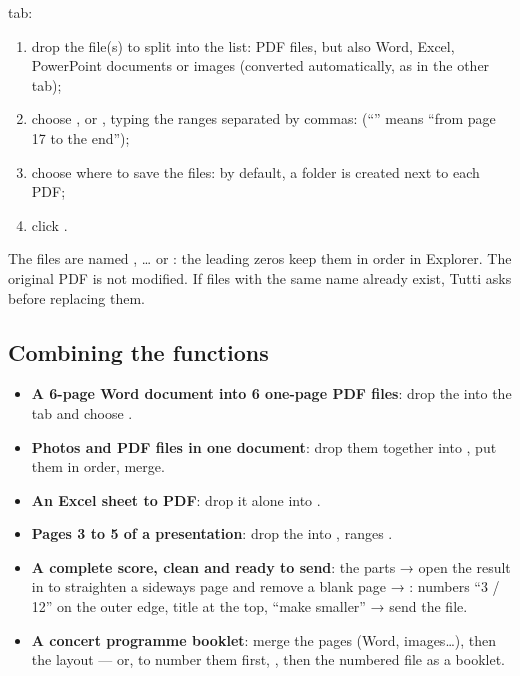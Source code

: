  tab:
\begin{enumerate}
\item drop the file(s) to split into the list: PDF files, but also Word, Excel, PowerPoint
      documents or images (converted automatically, as in the other tab);
\item choose , or , typing the ranges separated by
      commas:  (“” means “from page 17 to the end”);
\item choose where to save the files: by default, a  folder is created
      next to each PDF;
\item click .
\end{enumerate}
The files are named , … or
: the leading zeros keep them in order in Explorer.
The original PDF is not modified. If files with the same name already exist, Tutti asks before
replacing them.


\subsection*{Combining the functions}
\begin{itemize}
\item \textbf{A 6-page Word document into 6 one-page PDF files}: drop the  into the
       tab and choose .
\item \textbf{Photos and PDF files in one document}: drop them together into ,
      put them in order, merge.
\item \textbf{An Excel sheet to PDF}: drop it alone into .
\item \textbf{Pages 3 to 5 of a presentation}: drop the  into , ranges .
\item \textbf{A complete score, clean and ready to send}:  the parts → open the result in
       to straighten a sideways page and remove a blank page → : numbers
      “3 / 12” on the outer edge, title at the top, “make smaller” → send the  file.
\item \textbf{A concert programme booklet}: merge the pages (Word, images…), then the 
      layout — or, to number them first, , then  the numbered file as a booklet.
\end{itemize}

